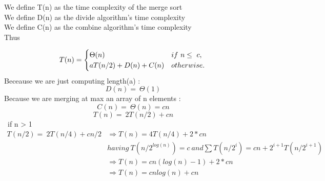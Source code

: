 \documentclass{report}
\begin{document}
We define T(n) as the time complexity of the merge sort\\
We define D(n) as the divide algorithm's time complexity\\
We define C(n) as the combine algorithm's time complexity\\

Thus

$$
T(n) =
\begin{cases}
\Theta(n) &if \ n \leq \ c ,\\
aT(n/2) + D(n) + C(n) &otherwise. \\
\end{cases}\\
$$
Beceause we are just computing length(a) :
$$D(n) = \ \Theta(1) $$
Because we are merging at max an array of n elements :\\
$$C(n) = \ \Theta(n) = cn $$
$$T(n) = \ 2T(n/2) + cn $$ \ if n > 1 \\
$$
\begin{align*}
T(n/2) = \ 2T(n/4) + cn/2  &\Rightarrow T(n) = 4T(n/4) + 2*cn \\
& having \ T(n/2^{log(n)}) = c \ and \sum T(n/2^i) = cn + 2^{i+1}T(n/2^{i+1}) \\
&\Rightarrow T(n) = cn(log(n) - 1) + 2*cn\\
&\Rightarrow T(n) = cnlog(n) + cn
\end{align*}
$$
\end{document}
